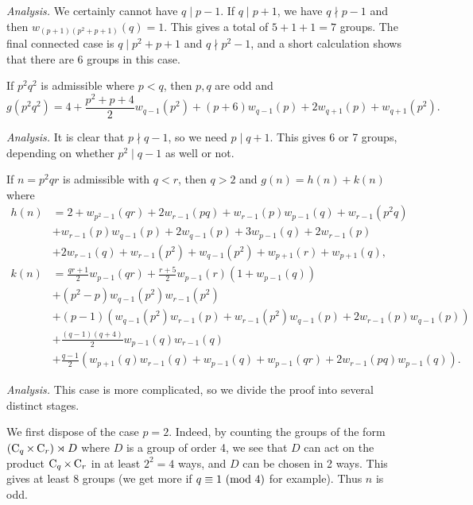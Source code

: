 \textit{Analysis.} We certainly cannot have $q \mid p - 1$. If $q \mid p + 1$, we have $q \nmid p - 1$ and then $w_{(p + 1)(p^2 + p + 1)}(q) = 1$. This gives a total of $5 + 1 + 1 = 7$ groups. The final connected case is $q \mid p^2 + p + 1$ and $q \nmid p^2 - 1$, and a short calculation shows that there are 6 groups in this  case.

\begin{fact}
	If $p^2 q^2$ is admissible where $p < q$, then $p, q$ are odd and
	\[g(p^2 q^2) = 4 + \frac{p^2 + p + 4}{2} w_{q - 1}(p^2) + (p + 6)w_{q - 1}(p) + 2w_{q + 1}(p) + w_{q + 1}(p^2).\]
\end{fact}

\textit{Analysis.} It is clear that $p \nmid q - 1$, so we need $p \mid q + 1$. This gives 6 or 7 groups, depending on whether $p^2 \mid q - 1$ as well or not.

\begin{fact} 
	If $n = p^2 q r$ is admissible with $q < r$, then $q > 2$ and $g(n) = h(n) + k(n)$ where$$\begin{aligned}
		h(n) &= 2 + w_{p^2 - 1}(qr) + 2w_{r - 1}(pq) + w_{r - 1}(p)w_{p - 1}(q) + w_{r - 1}(p^2 q) \\ 
		&+ w_{r - 1}(p)w_{q - 1}(p) + 2w_{q - 1}(p) + 3w_{p - 1}(q) + 2w_{r - 1}(p) \\ 
		&+ 2w_{r - 1}(q) + w_{r - 1}(p^2) + w_{q - 1}(p^2) + w_{p + 1}(r) + w_{p + 1}(q), \\
		k(n) &= \frac{qr + 1}{2} w_{p - 1}(qr) + \frac{r + 5}{2} w_{p - 1}(r)(1 + w_{p - 1}(q))\\
		&+ (p^2 - p)w_{q - 1}(p^2)w_{r - 1}(p^2) \\
		&+ (p - 1)(w_{q - 1}(p^2)w_{r - 1}(p) + w_{r - 1}(p^2)w_{q - 1}(p) + 2w_{r - 1}(p)w_{q - 1}(p)) \\
		&+ \frac{(q - 1)(q + 4)}{2} w_{p - 1}(q)w_{r - 1}(q) \\
		&+ \frac{q - 1}{2} (w_{p + 1}(q)w_{r - 1}(q) + w_{p - 1}(q) + w_{p - 1}(qr) + 2w_{r - 1}(pq)w_{p - 1}(q)).
	\end{aligned}$$
\end{fact}

\textit{Analysis.} This case is more complicated, so we divide the proof into several distinct stages.

We first dispose of the case $p = 2$. Indeed, by counting the groups of the form $(\operatorname{C}_{q} \times \operatorname{C}_{r}) \rtimes D$ where $D$ is a group of order 4, we see that $D$ can act on the product $\operatorname{C}_{q} \times \operatorname{C}_{r}$ in at least $2^2 = 4$ ways, and $D$ can be chosen in 2 ways. This gives at least 8 groups (we get more if $q \equiv 1 \ (\mathrm{mod} \ 4)$ for example). Thus $n$ is odd.

